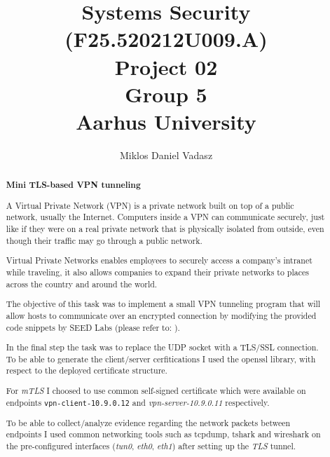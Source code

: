 \documentclass[10pt,a4paper]{article}
\title{ Systems Security (F25.520212U009.A) \\
        Project 02 \\
        Group 5 \\
        Aarhus University%
}
\author{Miklos Daniel Vadasz}
\begin{document}
\maketitle\thispagestyle{empty}
\makeatletter

\newpage
\tableofcontents\thispagestyle{empty}
\lstlistoflistings
\newpage

\thispagestyle{empty}
\begin{abstract}

\begin{center}
    \textbf{Mini TLS-based VPN tunneling}
\end{center}

A Virtual Private Network (VPN)\cite{network.vpn} is a private network built on top of a public network, usually the Internet.
Computers inside a VPN can communicate securely, just like if they were on a real private network that is
physically isolated from outside, even though their traffic may go through a public network.

Virtual Private Networks enables employees to securely access a company’s intranet while traveling, it also allows companies to expand their private networks to places across the country and around the world.

The objective of this task was to implement a small VPN tunneling program that will allow hosts to communicate over an encrypted connection by modifying the provided code snippets by SEED Labs (please refer to: \cite{seedlab2024}).

In the final step the task was to replace the UDP socket with a TLS/SSL connection. To be able to generate the client/server cerfitications I used the openssl library, with respect to the deployed certificate structure.  

For \textit{mTLS}\cite{network.mtls} I choosed to use common self-signed certificate which were available on endpoints \lstinline{vpn-client-10.9.0.12} and \textit{vpn-server-10.9.0.11} respectively.

To be able to collect/analyze evidence regarding the network packets between endpoints I used common networking tools such as tcpdump\cite{bin.tcpdump}, tshark\cite{bin.tshark} and wireshark\cite{wiresharkorg} on the pre-configured interfaces (\textit{tun0}, \textit{eth0}, \textit{eth1}) after setting up the \textit{TLS}\cite{tls13security} tunnel. 
\end{abstract}

\newpage
\end{document}
